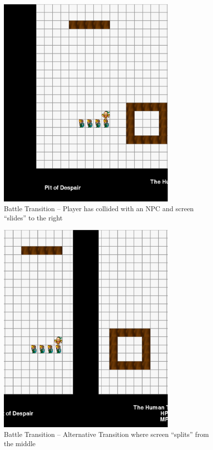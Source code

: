 \documentclass[11pt]{article}
\begin{document}
\begin{figure}[h!]
\begin{center}
\leavevmode
\includegraphics[width=0.8\textwidth]{images/overworld_horizlefttransition}
\end{center}
\caption{Battle Transition -- Player has collided with an NPC and screen ``slides'' to the right}
\end{figure}
\newpage

\begin{figure}[h!]
\begin{center}
\leavevmode
\includegraphics[width=0.8\textwidth]{images/overworld_horizsplit}
\end{center}
\caption{Battle Transition -- Alternative Transition where screen ``splits'' from the middle}
\end{figure}
\newpage
\end{document}
